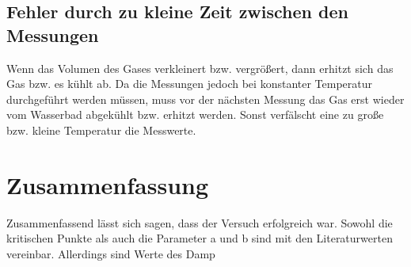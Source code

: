 \documentclass[11pt, a4paper]{article}
\begin{document}
    \subsection{Fehler durch zu kleine Zeit zwischen den Messungen}

    Wenn das Volumen des Gases verkleinert bzw. vergrößert, dann erhitzt sich das Gas bzw. es kühlt ab.
    Da die Messungen jedoch bei konstanter Temperatur durchgeführt werden müssen, muss vor 
    der nächsten Messung das Gas erst wieder vom Wasserbad abgekühlt bzw. erhitzt werden. Sonst verfälscht
    eine zu große bzw. kleine Temperatur die Messwerte.
    \section{Zusammenfassung}
	Zusammenfassend lässt sich sagen, dass der Versuch erfolgreich war. Sowohl die kritischen Punkte als auch die Parameter a und b sind mit den 
	Literaturwerten vereinbar. Allerdings sind Werte des Damp

    
    
\end{document}

